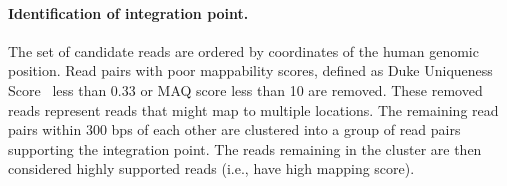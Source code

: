 \documentclass{bioinfo}
\begin{document}
\paragraph{\textbf{Identification of integration point.}}  The set of candidate reads are ordered by coordinates of the human genomic position.  Read pairs with poor mappability scores, defined as Duke Uniqueness Score~\cite{unknown} less than 0.33 or MAQ score less than 10 are removed.  These removed reads represent reads that might map to multiple locations.  The remaining read pairs within 300 bps of each other are clustered into a group of read pairs supporting the integration point.  The reads remaining in the cluster are then considered highly supported reads (i.e., have high mapping score).  



\end{document}
